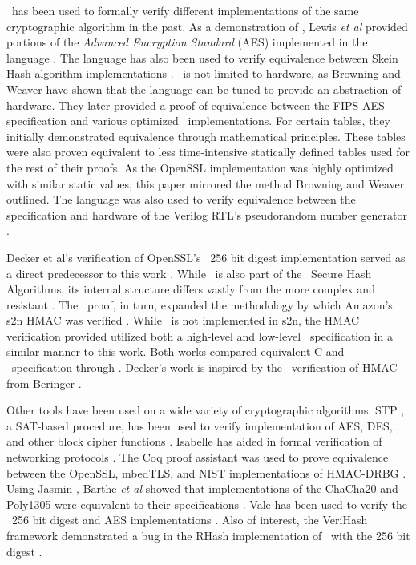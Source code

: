 \cryptol\ has been used to formally verify different implementations of the same cryptographic algorithm in the past.
As a demonstration of \cryptol, Lewis \emph{et al} provided portions of the \emph{Advanced Encryption Standard} (AES) implemented in the language \cite{crypt-hi}.
The language has also been used to verify equivalence between Skein Hash algorithm implementations \cite{hard-soft}.
\cryptol\ is not limited to hardware, as Browning and Weaver \cite{design-verif} have shown that the language can be tuned to provide an abstraction of hardware.
They later provided a proof of equivalence between the FIPS AES specification and various optimized \cryptol\ implementations.
For certain tables, they initially demonstrated equivalence through mathematical principles.
These tables were also proven equivalent to less time-intensive statically defined tables used for the rest of their proofs.
As the OpenSSL implementation was highly optimized with similar static values, this paper mirrored the method Browning and Weaver outlined.
The language was also used to verify equivalence between the specification and hardware of the Verilog RTL's pseudorandom number generator \cite{pseudorandom}.

Decker et al's verification of OpenSSL's \shaTwo\ 256 bit digest implementation served as a direct predecessor to this work \cite{nfm-us}.
While \shaTwo\ is also part of the \nist\ Secure Hash Algorithms, its internal structure differs vastly from the more complex and resistant \shaThree.
The \shaTwo\ proof, in turn, expanded the methodology by which Amazon's s2n HMAC was verified \cite{chudnov,s2n-blog}.
While \shaThree\ is not implemented in s2n, the HMAC verification provided utilized both a high-level and low-level \cryptol\ specification in a similar manner to this work.
Both works compared equivalent C and \cryptol\ specification through \saw.
Decker's work is inspired by the \openssl\ verification of HMAC from Beringer \cite{beringer}.

Other tools have been used on a wide variety of cryptographic algorithms.
STP \cite{stp}, a SAT-based procedure, has been used to verify implementation of AES, DES, \shaOne, and other block cipher functions \cite{auto}.
Isabelle has aided in formal verification of networking protocols \cite{isabelle,formal-protocols}.
The Coq proof assistant was used to prove equivalence between the OpenSSL, mbedTLS, and NIST implementations of HMAC-DRBG \cite{coq,verified-correctness}.
Using Jasmin \cite{jasmin}, Barthe \emph{et al} showed that implementations of the ChaCha20 and Poly1305 were equivalent to their specifications \cite{hi-assurance}.
Vale has been used to verify the \shaTwo\ 256 bit digest and AES implementations \cite{vale}.
Also of interest, the VeriHash framework demonstrated a bug in the RHash implementation of \shaThree\ with the 256 bit digest \cite{rhash,hash-functions}.
